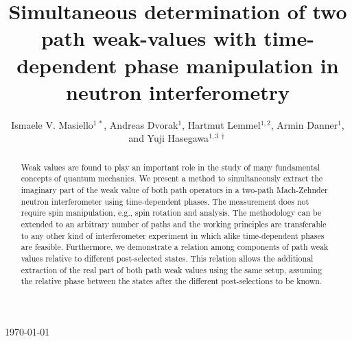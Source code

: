 \documentclass[12pt]{iopart}
\begin{document}
\title[]{Simultaneous determination of two path weak-values with time-dependent phase manipulation in neutron interferometry}

\author{Ismaele V. Masiello$^{1\,*}$, Andreas Dvorak$^{1}$, Hartmut Lemmel$^{1,2}$, Armin Danner$^{1}$, and Yuji Hasegawa$^{1,3\,\dagger}$}
\address{$^1$Atominstitut, TU Wien, Stadionallee 2, 1020 Vienna, Austria \\
$^2$Institut Laue-Langevin, 71 avenue des Martyrs, 38000 Grenoble, France\\
$^3$Department of Applied Physics, Hokkaido University, Kita-ku, Sapporo 060-8628, Japan\\
$^{*\dagger}$Authors to whom any correspondence should be addressed
}

\vspace{10pt}
\begin{indented}
\item[]\today
\end{indented}

\begin{abstract}
Weak values are found to play an important role in the study of many fundamental concepts of quantum mechanics. We present a method to simultaneously extract the imaginary part of the weak value of both path operators in a two-path Mach-Zehnder neutron interferometer using time-dependent phases. The measurement does not require spin manipulation, e.g., spin rotation and analysis. The methodology can be extended to an arbitrary number of paths and the working principles are transferable to any other kind of interferometer experiment in which alike time-dependent phases are feasible. Furthermore, we demonstrate a relation among components of path weak values relative to different post-selected states. This relation allows the additional extraction of the real part of both path weak values using the same setup, assuming the relative phase between the states after the different post-selections to be known.
\end{abstract}
\end{document}
